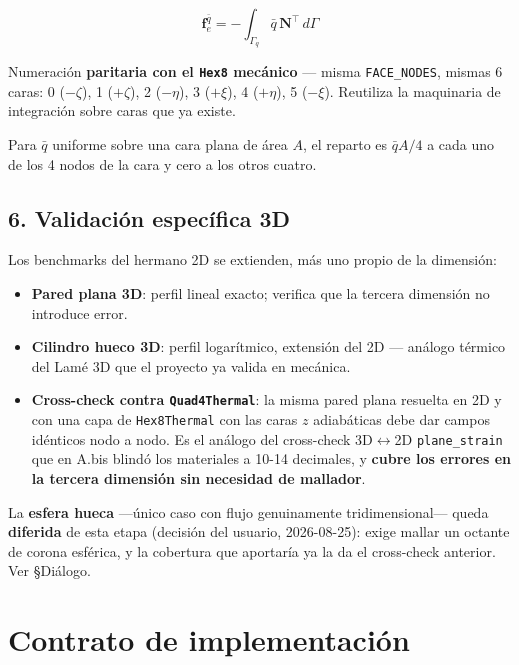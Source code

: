 \documentclass[11pt,letterpaper,oneside]{report}
\begin{document}
\[
\mathbf f^{\bar q}_e = -\int_{\Gamma_q} \bar q\,\mathbf N^\top\,d\Gamma
\]

Numeración \textbf{paritaria con el \texttt{Hex8} mecánico} --- misma \texttt{FACE\_NODES}, mismas 6 caras: 0 ($-\zeta$), 1 ($+\zeta$), 2 ($-\eta$), 3 ($+\xi$), 4 ($+\eta$), 5 ($-\xi$). Reutiliza la maquinaria de integración sobre caras que ya existe.

Para $\bar q$ uniforme sobre una cara plana de área $A$, el reparto es $\bar q A/4$ a cada uno de los 4 nodos de la cara y cero a los otros cuatro.

\subsection{6. Validación específica 3D}

Los benchmarks del hermano 2D se extienden, más uno propio de la dimensión:

\begin{itemize}
  \item \textbf{Pared plana 3D}: perfil lineal exacto; verifica que la tercera dimensión no introduce error.
  \item \textbf{Cilindro hueco 3D}: perfil logarítmico, extensión del 2D --- análogo térmico del Lamé 3D que el proyecto ya valida en mecánica.
  \item \textbf{Cross-check contra \texttt{Quad4Thermal}}: la misma pared plana resuelta en 2D y con una capa de \texttt{Hex8Thermal} con las caras $z$ adiabáticas debe dar campos idénticos nodo a nodo. Es el análogo del cross-check 3D\ensuremath{\leftrightarrow}2D \texttt{plane\_strain} que en A.bis blindó los materiales a 10-14 decimales, y \textbf{cubre los errores en la tercera dimensión sin necesidad de mallador}.
\end{itemize}

La \textbf{esfera hueca} ---único caso con flujo genuinamente tridimensional--- queda \textbf{diferida} de esta etapa (decisión del usuario, 2026-08-25): exige mallar un octante de corona esférica, y la cobertura que aportaría ya la da el cross-check anterior. Ver §Diálogo.


\section{Contrato de implementación}
\end{document}
